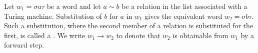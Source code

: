 Let $w_1 = \sigma a \tau$ be a word and let $a \sim b$ be a relation in the list associated with a Turing machine. Substitution of $b$ for $a$ in $w_1$ gives the equivalent word $w_2 = \sigma b \tau$. Such a substitution, where the second member of a relation is substituted for the first, is called a . We write $w_1 \rightarrow w_2$ to denote that $w_2$ is obtainable from $w_1$ by a forward step.
